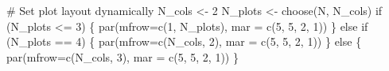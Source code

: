 \documentclass[
  letterpaper,
  DIV=11,
  numbers=noendperiod]{scrartcl}
\newenvironment{Shaded}{\begin{snugshade}}{\end{snugshade}}
\newcommand{\AttributeTok}[1]{\textcolor[rgb]{0.40,0.45,0.13}{#1}}
\newcommand{\CommentTok}[1]{\textcolor[rgb]{0.37,0.37,0.37}{#1}}
\newcommand{\ControlFlowTok}[1]{\textcolor[rgb]{0.00,0.23,0.31}{#1}}
\newcommand{\DecValTok}[1]{\textcolor[rgb]{0.68,0.00,0.00}{#1}}
\newcommand{\FunctionTok}[1]{\textcolor[rgb]{0.28,0.35,0.67}{#1}}
\newcommand{\NormalTok}[1]{\textcolor[rgb]{0.00,0.23,0.31}{#1}}
\newcommand{\OtherTok}[1]{\textcolor[rgb]{0.00,0.23,0.31}{#1}}
\newcommand{\SpecialCharTok}[1]{\textcolor[rgb]{0.37,0.37,0.37}{#1}}
\begin{document}
\begin{Shaded}
\begin{Highlighting}[]
  \CommentTok{\# Set plot layout dynamically}
\NormalTok{  N\_cols }\OtherTok{\textless{}{-}} \DecValTok{2}
\NormalTok{  N\_plots }\OtherTok{\textless{}{-}} \FunctionTok{choose}\NormalTok{(N, N\_cols)}
  \ControlFlowTok{if}\NormalTok{ (N\_plots }\SpecialCharTok{\textless{}=} \DecValTok{3}\NormalTok{) \{}
    \FunctionTok{par}\NormalTok{(}\AttributeTok{mfrow=}\FunctionTok{c}\NormalTok{(}\DecValTok{1}\NormalTok{, N\_plots), }\AttributeTok{mar =} \FunctionTok{c}\NormalTok{(}\DecValTok{5}\NormalTok{, }\DecValTok{5}\NormalTok{, }\DecValTok{2}\NormalTok{, }\DecValTok{1}\NormalTok{))}
\NormalTok{  \} }\ControlFlowTok{else} \ControlFlowTok{if}\NormalTok{ (N\_plots }\SpecialCharTok{==} \DecValTok{4}\NormalTok{) \{}
    \FunctionTok{par}\NormalTok{(}\AttributeTok{mfrow=}\FunctionTok{c}\NormalTok{(N\_cols, }\DecValTok{2}\NormalTok{), }\AttributeTok{mar =} \FunctionTok{c}\NormalTok{(}\DecValTok{5}\NormalTok{, }\DecValTok{5}\NormalTok{, }\DecValTok{2}\NormalTok{, }\DecValTok{1}\NormalTok{))}
\NormalTok{  \} }\ControlFlowTok{else}\NormalTok{ \{}
    \FunctionTok{par}\NormalTok{(}\AttributeTok{mfrow=}\FunctionTok{c}\NormalTok{(N\_cols, }\DecValTok{3}\NormalTok{), }\AttributeTok{mar =} \FunctionTok{c}\NormalTok{(}\DecValTok{5}\NormalTok{, }\DecValTok{5}\NormalTok{, }\DecValTok{2}\NormalTok{, }\DecValTok{1}\NormalTok{))}
\NormalTok{  \}}
  

\end{Highlighting}
\end{Shaded}
\end{document}
